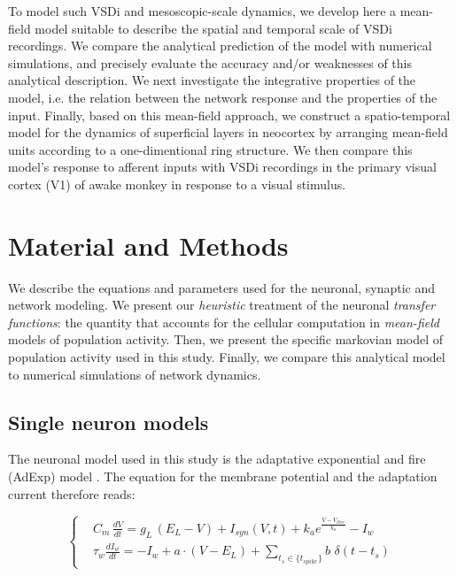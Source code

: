 \documentclass[8pt, colorlinks, a4paper]{article}
\newcommand{\corr}[1]{{#1}}
\begin{document}
\corr{To model such VSDi and mesoscopic-scale dynamics, we develop
  here a mean-field model suitable to describe the spatial and
  temporal scale of VSDi recordings.  We compare the analytical
  prediction of the model with numerical simulations, and precisely
  evaluate the accuracy and/or weaknesses of this analytical
  description. We next investigate the integrative properties of the
  model, i.e.  the relation between the network response and the
  properties of the input. Finally, based on this mean-field approach,
  we construct a spatio-temporal model for the dynamics of superficial
  layers in neocortex by arranging mean-field units according to a
  one-dimentional ring structure. We then compare this model's
  response to afferent inputs with VSDi recordings in the primary
  visual cortex (V1) of awake monkey in response to a visual
  stimulus.}


\section{Material and Methods}
\label{sec-3}
\small

We describe the equations and parameters used for the neuronal,
synaptic and network modeling. We present our \emph{heuristic}
treatment of the neuronal \emph{transfer functions}: the quantity that
accounts for the cellular computation in \emph{mean-field} models of
population activity. Then, we present the specific markovian model of
population activity used in this study. Finally, we compare this
analytical model to numerical simulations of network dynamics.

\subsection{Single neuron models}
\label{sec-3-1}

The neuronal model used in this study is the adaptative exponential
and fire (AdExp) model \cite{Brette2005a}. The equation for the membrane
potential and the adaptation current therefore reads:

\begin{equation}
\label{eq:iAdExp}
  \left\{
  \begin{split}
  & C_m\,\frac{dV}{dt} = g_{L} \,(E_{L}-V) + I_{syn}(V,t) + k_a e^{\frac{V - V_{thre} }{k_a}}- I_w \\
  & \tau_w \frac{d I_w}{dt} = - I_w +  a \cdot (V-E_L) + \sum_{t_s \in \{t_{spike}\}} b \, \, \delta (t-t_s)
  \end{split}
\right.
\end{equation}
\end{document}
